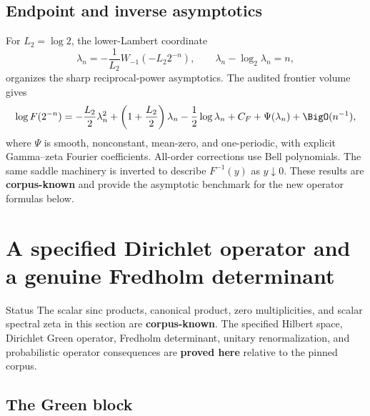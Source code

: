 \documentclass[11pt]{article}
\theoremstyle{definition}
\theoremstyle{remark}
\newcommand{\CorpusKnown}{\textcolor{linkblue}{\textbf{corpus-known}}}
\newcommand{\ProvedHere}{\textcolor{deepgreen}{\textbf{proved here}}}
\begin{document}
\subsection{Endpoint and inverse asymptotics}

For \(L_2=\log2\), the lower-Lambert coordinate
\begin{equation}
 \lambda_n=-\frac1{L_2}W_{-1}(-L_2 2^{-n}),
 \qquad \lambda_n-\log_2\lambda_n=n,
 \label{p4:eq:lambda-n}
\end{equation}
organizes the sharp reciprocal-power asymptotics.  The audited frontier volume gives
\begin{equation}
 \log F(2^{-n})
 =-\frac{L_2}{2}\lambda_n^2
 +\left(1+\frac{L_2}{2}\right)\lambda_n
 -\frac12\log\lambda_n+C_F+\Psi(\lambda_n)+\BigO(n^{-1}),
 \label{p4:eq:sharp-dyadic-asymptotic}
\end{equation}
where \(\Psi\) is smooth, nonconstant, mean-zero, and one-periodic, with explicit
Gamma--zeta Fourier coefficients.  All-order corrections use Bell polynomials.  The
same saddle machinery is inverted to describe \(F^{-1}(y)\) as \(y\downarrow0\).
These results are \CorpusKnown{} and provide the asymptotic benchmark for the new
operator formulas below.

\section{A specified Dirichlet operator and a genuine Fredholm determinant}
\label{p4:sec:operator}

\begin{statusboxPartiv}{Status}
The scalar sinc products, canonical product, zero multiplicities, and scalar spectral
zeta in this section are \CorpusKnown{}.  The specified Hilbert space, Dirichlet Green
operator, Fredholm determinant, unitary renormalization, and probabilistic operator
consequences are \ProvedHere{} relative to the pinned corpus.
\end{statusboxPartiv}

\subsection{The Green block}
\end{document}
